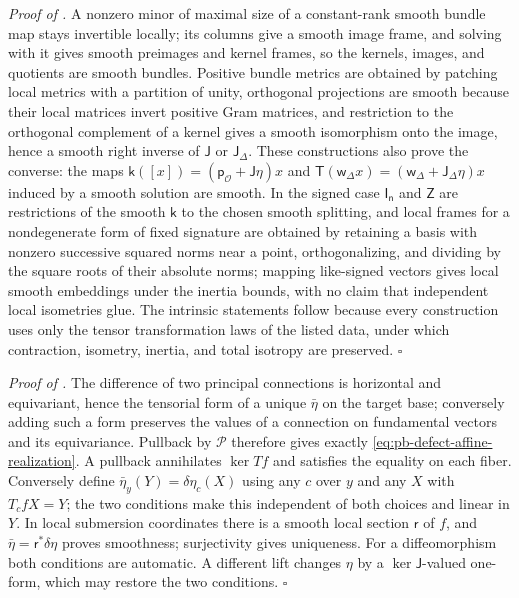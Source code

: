 \noindent\emph{Proof of .}
A nonzero minor of maximal size of a constant-rank smooth bundle map stays invertible locally; its
columns give a smooth image frame, and solving with it gives smooth preimages and kernel frames, so the
kernels, images, and quotients are smooth bundles. Positive bundle metrics are obtained by patching
local metrics with a partition of unity, orthogonal projections are smooth because their local matrices
invert positive Gram matrices, and restriction to the orthogonal complement of a kernel gives a smooth
isomorphism onto the image, hence a smooth right inverse of \(\mathsf J\) or \(\mathsf J_\Delta\). These
constructions also prove the converse: the maps
\(\mathsf k([x])=(\mathsf p_{\mathcal O}+\mathsf J\eta)x\) and
\(\mathsf T(\mathsf w_\Delta x)=(\mathsf w_\Delta+\mathsf J_\Delta\eta)x\) induced by a smooth solution are
smooth. In the signed case \(\mathsf I_{\mathsf n}\) and \(\mathsf Z\) are restrictions of the smooth
\(\mathsf k\) to the chosen smooth splitting, and local frames for a nondegenerate form of fixed signature
are obtained by retaining a basis with nonzero successive squared norms near a point, orthogonalizing,
and dividing by the square roots of their absolute norms; mapping like-signed vectors gives local smooth
embeddings under the inertia bounds, with no claim that independent local isometries glue. The
intrinsic statements follow because every construction uses only the tensor transformation laws of the
listed data, under which contraction, isometry, inertia, and total isotropy are preserved.
\hfill$\square$

\noindent\emph{Proof of .}
The difference of two principal connections is horizontal and equivariant, hence the tensorial form of a
unique \(\bar\eta\) on the target base; conversely adding such a form preserves the values of a
connection on fundamental vectors and its equivariance. Pullback by \(\mathcal P\) therefore gives
exactly \eqref{eq:pb-defect-affine-realization}. A pullback annihilates \(\ker Tf\) and satisfies the
equality on each fiber. Conversely define \(\bar\eta_y(Y)=\delta\eta_c(X)\) using any \(c\) over \(y\) and
any \(X\) with \(T_cfX=Y\); the two conditions make this independent of both choices and linear in
\(Y\). In local submersion coordinates there is a smooth local section \(\mathsf r\) of \(f\), and
\(\bar\eta=\mathsf r^*\delta\eta\) proves smoothness; surjectivity gives uniqueness. For a
diffeomorphism both conditions are automatic. A different lift changes \(\eta\) by a
\(\ker\mathsf J\)-valued one-form, which may restore the two conditions. \hfill$\square$

